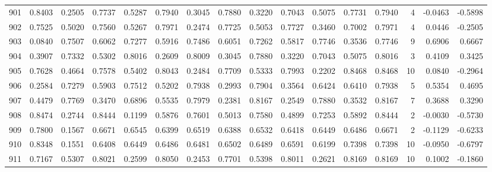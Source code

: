 \begin{tabular}{lrrrrrrrrrrrrrrr}
901 &      0.8403 &  0.2505 &  0.7737 &  0.5287 &  0.7940 &  0.3045 &  0.7880 &  0.3220 &  0.7043 &  0.5075 &   0.7731 &     0.7940 &      4 &                   -0.0463 &                    -0.5898 \\
902 &      0.7525 &  0.5020 &  0.7560 &  0.5267 &  0.7971 &  0.2474 &  0.7725 &  0.5053 &  0.7727 &  0.3460 &   0.7002 &     0.7971 &      4 &                    0.0446 &                    -0.2505 \\
903 &      0.0840 &  0.7507 &  0.6062 &  0.7277 &  0.5916 &  0.7486 &  0.6051 &  0.7262 &  0.5817 &  0.7746 &   0.3536 &     0.7746 &      9 &                    0.6906 &                     0.6667 \\
904 &      0.3907 &  0.7332 &  0.5302 &  0.8016 &  0.2609 &  0.8009 &  0.3045 &  0.7880 &  0.3220 &  0.7043 &   0.5075 &     0.8016 &      3 &                    0.4109 &                     0.3425 \\
905 &      0.7628 &  0.4664 &  0.7578 &  0.5402 &  0.8043 &  0.2484 &  0.7709 &  0.5333 &  0.7993 &  0.2202 &   0.8468 &     0.8468 &     10 &                    0.0840 &                    -0.2964 \\
906 &      0.2584 &  0.7279 &  0.5903 &  0.7512 &  0.5202 &  0.7938 &  0.2993 &  0.7904 &  0.3564 &  0.6424 &   0.6410 &     0.7938 &      5 &                    0.5354 &                     0.4695 \\
907 &      0.4479 &  0.7769 &  0.3470 &  0.6896 &  0.5535 &  0.7979 &  0.2381 &  0.8167 &  0.2549 &  0.7880 &   0.3532 &     0.8167 &      7 &                    0.3688 &                     0.3290 \\
908 &      0.8474 &  0.2744 &  0.8444 &  0.1199 &  0.5876 &  0.7601 &  0.5013 &  0.7580 &  0.4899 &  0.7253 &   0.5892 &     0.8444 &      2 &                   -0.0030 &                    -0.5730 \\
909 &      0.7800 &  0.1567 &  0.6671 &  0.6545 &  0.6399 &  0.6519 &  0.6388 &  0.6532 &  0.6418 &  0.6449 &   0.6486 &     0.6671 &      2 &                   -0.1129 &                    -0.6233 \\
910 &      0.8348 &  0.1551 &  0.6408 &  0.6449 &  0.6486 &  0.6481 &  0.6502 &  0.6489 &  0.6591 &  0.6199 &   0.7398 &     0.7398 &     10 &                   -0.0950 &                    -0.6797 \\
911 &      0.7167 &  0.5307 &  0.8021 &  0.2599 &  0.8050 &  0.2453 &  0.7701 &  0.5398 &  0.8011 &  0.2621 &   0.8169 &     0.8169 &     10 &                    0.1002 &                    -0.1860 \\

\end{tabular}
